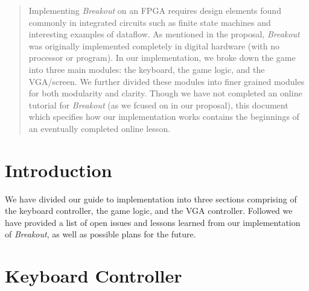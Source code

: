 \documentclass[conference]{IEEEtran}
\begin{document}
\begin{abstract}
Implementing \emph{Breakout} on an FPGA requires design elements found commonly in integrated circuits such as finite state machines and interesting examples of dataflow. As mentioned in the proposal, \emph{Breakout} was originally implemented completely in digital hardware (with no processor or program). In our implementation, we broke down the game into three main modules: the keyboard, the game logic, and the VGA/screen. We further divided these modules into finer grained modules for both modularity and clarity. Though we have not completed an online tutorial for \emph{Breakout} (as we fcused on in our proposal), this document which specifies how our implementation works contains the beginnings of an eventually completed online lesson.
\end{abstract}





%
\IEEEpeerreviewmaketitle



\section{Introduction}We have divided our guide to implementation into three sections comprising of the keyboard controller, the game logic, and the VGA controller. Followed we have provided a list of open issues and lessons learned from our implementation of \emph{Breakout}, as well as possible plans for the future.

\section{Keyboard Controller}
\end{document}
